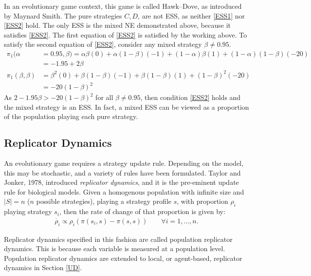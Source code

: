 In an evolutionary game context, this game is called Hawk--Dove, as introduced by Maynard Smith. The pure strategies $C,D$, are not ESS, as neither \eqref{ESS1} nor \eqref{ESS2} hold. The only ESS is the mixed NE demonstrated above, because it satisfies \eqref{ESS2}. The first equation of \eqref{ESS2} is satisfied by the working above. To satisfy the second equation of \eqref{ESS2}, consider any mixed strategy $\beta \neq 0.95$.  \\
\begin{align*}
    \pi_1(\alpha &= 0.95,\beta) = \alpha \beta (0) + \alpha(1-\beta)(-1)+ (1-\alpha)\beta(1) + (1-\alpha)(1-\beta)(-20) \\
    &= -1.95 + 2\beta\\
    \pi_1(\beta,\beta) &= \beta^2(0) + \beta(1-\beta)(-1) + \beta(1-\beta)(1) + (1-\beta)^2(-20)\\
    &= -20(1-\beta)^2
\end{align*}
As $2-1.95\beta> -20(1-\beta)^2$ for all $\beta \neq 0.95$, then condition \eqref{ESS2} holds and the mixed strategy is an ESS. In fact, a mixed ESS can be viewed as a proportion of the population playing each pure strategy.  



\subsection{Replicator Dynamics}
An evolutionary game requires a strategy update rule. Depending on the model, this may be stochastic, and a variety of rules have been formulated. Taylor and Jonker, 1978, introduced \emph{replicator dynamics}, and it is the pre-eminent update rule for biological models. Given a homogenous population with infinite size and $|S| = n$ ($n$ possible strategies), playing a strategy profile $s$, with proportion $\rho_i$ playing strategy $s_i$, then the rate of change of that proportion is given by: 
\begin{align} \label{Replicator}
    \dot{\rho_i} \propto \rho_i(\pi(s_i, s) - \pi(s, s) ) \qquad\forall i = 1, \dots, n.
\end{align}

Replicator dynamics specified in this fashion are called population replicator dynamics. This is because each variable is measured at a population level. Population replicator dynamics are extended to local, or agent-based, replicator dynamics in Section \ref{UD}. 

